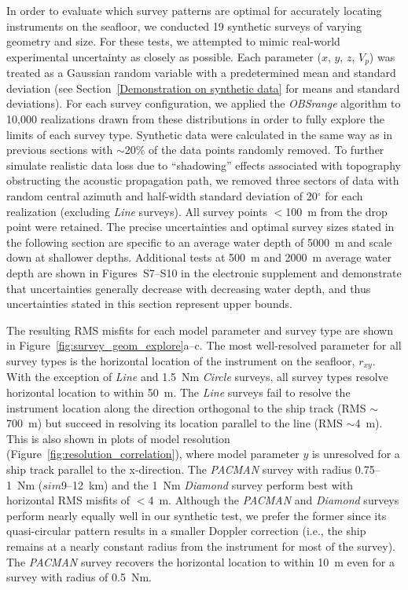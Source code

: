 In order to evaluate which survey patterns are optimal for accurately locating instruments on the seafloor, we conducted 19 synthetic surveys of varying geometry and size. For these tests, we attempted to mimic real-world experimental uncertainty as closely as possible. Each parameter ($x$, $y$, $z$, $V_p$) was treated as a Gaussian random variable with a predetermined mean and standard deviation (see Section~\ref{Demonstration on synthetic data} for means and standard deviations). For each survey configuration, we applied the \textit{OBSrange} algorithm to 10,000 realizations drawn from these distributions in order to fully explore the limits of each survey type. Synthetic data were calculated in the same way as in previous sections with $\sim$20\% of the data points randomly removed. To further simulate realistic data loss due to ``shadowing'' effects associated with topography obstructing the acoustic propagation path, we removed three sectors of data with random central azimuth and half-width standard deviation of 20$^{\circ}$ for each realization (excluding \textit{Line} surveys). All survey points $<$100~m from the drop point were retained. The precise uncertainties and optimal survey sizes stated in the following section are specific to an average water depth of 5000~m and scale down at shallower depths. Additional tests at 500~m and 2000~m average water depth are shown in Figures~S7--S10 in the electronic supplement and demonstrate that uncertainties generally decrease with decreasing water depth, and thus uncertainties stated in this section represent upper bounds.

The resulting RMS misfits for each model parameter and survey type are shown in Figure~\ref{fig:survey_geom_explore}a--c. The most well-resolved parameter for all survey types is the horizontal location of the instrument on the seafloor, $r_{xy}$. With the exception of \textit{Line} and 1.5~Nm \textit{Circle} surveys, all survey types resolve horizontal location to within 50~m. The \textit{Line} surveys fail to resolve the instrument location along the direction orthogonal to the ship track (RMS $\sim$700~m) but succeed in resolving its location parallel to the line (RMS $\sim$4~m). This is also shown in plots of model resolution (Figure~\ref{fig:resolution_correlation}), where model parameter $y$ is unresolved for a ship track parallel to the x-direction. The \textit{PACMAN} survey with radius 0.75--1~Nm ($sim$9--12~km) and the 1~Nm \textit{Diamond} survey perform best with horizontal RMS misfits of $<$4~m. Although the \textit{PACMAN} and \textit{Diamond} surveys perform nearly equally well in our synthetic test, we prefer the former since its quasi-circular pattern results in a smaller Doppler correction (i.e., the ship remains at a nearly constant radius from the instrument for most of the survey). The \textit{PACMAN} survey recovers the horizontal location to within 10~m even for a survey with radius of 0.5~Nm.

